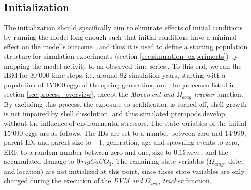 \subsection{Initialization}\label{sec:initialization}

The initialization should specifically aim to eliminate effects of initial conditions by running the model long enough such that initial conditions have a minimal effect on the model's outcome \citep{Grimm2020SecondUpdateODD}, and thus it is used to define a starting population structure for simulation experiments (section \ref{sec:simulation_experiments}) by mapping the model activity to an observed time series \citep{Grimm2006ODD,Auchincloss2015Healthresearch}. To this end, we ran the IBM for $30'000$ time steps, i.e. around 82 simulation years, starting with a population of $15'000$ eggs of the spring generation, and the processes listed in section \ref{sec:process_overview}, except the \textit{Movement and $\Omega_{arag}$ tracker} function. By excluding this process, the exposure to acidification is turned off, shell growth is not impaired by shell dissolution, and thus simulated pteropods develop without the influence of environmental stressors. The state variables of the initial $15'000$ eggs are as follows: The IDs are set to a number between zero and $14'999$, parent IDs and parent size to $-1$, generation, age and spawning events to zero, ERR to a random number between zero and one, size to $0.15\, mm$ \citep{Wang2017Lifecycle}, and the accumulated damage to $0 \, mg CaCO_3$. The remaining state variables ($\Omega_{arag}$, date, and location) are not initialized at this point, since these state variables are only changed during the execution of the \textit{DVM and $\Omega_{arag}$ tracker} function.


